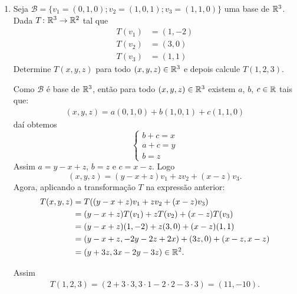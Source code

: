 \begin{exemplos}
    \begin{enumerate}[label={\arabic*})]
        \item Seja $\mathcal{B} = \{v_1 = (0, 1, 0); v_2 = (1, 0, 1); v_3 = (1, 1, 0)\}$ uma base de $\mathbb{R}^3$. Dada $T \colon \mathbb{R}^3 \to \mathbb{R}^2$ tal que
        \begin{align*}
            T(v_1) &= (1, -2)\\
            T(v_2) &= (3, 0)\\
            T(v_3) &= (1, 1)
        \end{align*}
        Determine $T(x, y, z)$ para todo $(x, y, z) \in \mathbb{R}^3$ e depois calcule $T(1, 2, 3)$.
        \begin{solucao}
            Como $\mathcal{B}$ é base de $\mathbb{R}^3$, então para todo $(x, y, z) \in \mathbb{R}^3$ existem $a$, $b$, $c \in \mathbb{R}$ tais que:
            \begin{align*}
            (x, y, z) = a(0, 1, 0) + b(1, 0, 1) + c(1, 1, 0)
            \end{align*}
            daí obtemos
            \[
                \begin{cases}
                b + c = x\\
                a + c = y\\
                b = z
                \end{cases}
            \]
            Assim $a = y - x + z$, $b = z$ e $c = x - z$. Logo
            \[
                (x, y, z) = (y - x + z)v_1 + zv_2 + (x - z)v_3.
            \]
            Agora, aplicando a transformação $T$ na expressão anterior:
            \begin{align*}
                T(x, y, z) &= T((y - x + z)v_1 + zv_2 + (x - z)v_3) \\ &= (y - x + z)T(v_1) + zT(v_2) + (x - z)T(v_3) \\ &= (y - x + z)(1, -2) + z(3, 0) + (x - z)(1, 1) \\ &= (y - x + z, -2y - 2z + 2x) + (3z, 0) + (x - z, x - z) \\ &= (y + 3z, 3x - 2y - 3z) \in \mathbb{R}^2.
            \end{align*}

            Assim
            \begin{align*}
                T(1, 2, 3) = (2 + 3\cdot3, 3\cdot 1 - 2 \cdot 2 - 3 \cdot 3) = (11, -10).
            \end{align*}
        \end{solucao}


\end{enumerate}
\end{exemplos}

